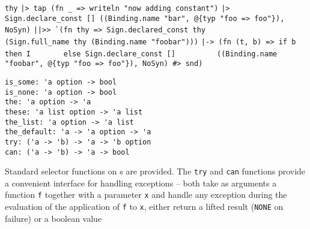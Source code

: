 \begin{isabellebody}
\begin{isamarkuptext}
  \smallskip\begin{mldecls}
\verb|thy|\isasep\isanewline%
\verb||\verb,|,\verb|> tap (fn _ => writeln "now adding constant")|\isasep\isanewline%
\verb||\verb,|,\verb|> Sign.declare_const [] ((Binding.name "bar", @{typ "foo => foo"}), NoSyn)|\isasep\isanewline%
\verb||\verb,|,\verb||\verb,|,\verb|>> `(fn thy => Sign.declared_const thy|\isasep\isanewline%
\verb|         (Sign.full_name thy (Binding.name "foobar")))|\isasep\isanewline%
\verb||\verb,|,\verb|-> (fn (t, b) => if b then I|\isasep\isanewline%
\verb|       else Sign.declare_const []|\isasep\isanewline%
\verb|         ((Binding.name "foobar", @{typ "foo => foo"}), NoSyn) #> snd)|\isasep\isanewline%

  \end{mldecls}%
\end{isamarkuptext}%
\isamarkuptrue%
%
\isamarkuptrue%
%
\isadelimmlref
%
\endisadelimmlref
%
\isatagmlref
%
\begin{isamarkuptext}%
\begin{mldecls}
  \verb|is_some: 'a option -> bool| \\
  \verb|is_none: 'a option -> bool| \\
  \verb|the: 'a option -> 'a| \\
  \verb|these: 'a list option -> 'a list| \\
  \verb|the_list: 'a option -> 'a list| \\
  \verb|the_default: 'a -> 'a option -> 'a| \\
  \verb|try: ('a -> 'b) -> 'a -> 'b option| \\
  \verb|can: ('a -> 'b) -> 'a -> bool| \\
  \end{mldecls}%
\end{isamarkuptext}%
\isamarkuptrue%
%
\endisatagmlref
{\isafoldmlref}%
%
\isadelimmlref
%
\endisadelimmlref
%
\begin{isamarkuptext}%
Standard selector functions on s are provided.  The
  \verb|try| and \verb|can| functions provide a convenient interface for
  handling exceptions -- both take as arguments a function \verb|f|
  together with a parameter \verb|x| and handle any exception during
  the evaluation of the application of \verb|f| to \verb|x|, either
  return a lifted result (\verb|NONE| on failure) or a boolean value

\end{isamarkuptext}
\end{isabellebody}
